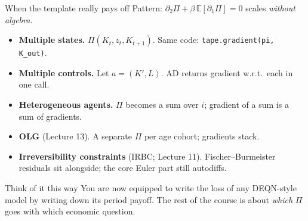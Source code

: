 \documentclass[aspectratio=169,11pt]{beamer}
\newcommand{\emphc}[1]{\textcolor{harvardcrimson}{#1}}
\begin{document}
\begin{frame}{When the template really pays off}
\small Pattern: $\partial_2 \Pi + \beta\,\mathbb{E}[\partial_1 \Pi] = 0$ scales \emph{without algebra}.
\vspace{2pt}
\begin{itemize}\itemsep3pt
\item \textbf{Multiple states.} $\Pi(K_t, z_t, K_{t+1})$. Same code: \texttt{tape.gradient(pi, K\_out)}.
\item \textbf{Multiple controls.} Let $a = (K', L)$. AD returns gradient w.r.t.\ each in one call.
\item \textbf{Heterogeneous agents.} $\Pi$ becomes a sum over $i$; gradient of a sum is a sum of gradients.
\item \textbf{OLG} (Lecture 13). A separate $\Pi$ per age cohort; gradients stack.
\item \textbf{Irreversibility constraints} (IRBC; Lecture 11). Fischer--Burmeister residuals sit alongside; the core Euler part still autodiffs.
\end{itemize}
\vspace{6pt}
\begin{exampleblock}{Think of it this way}
\small You are now equipped to write \emphc{the loss of any DEQN-style model} by writing down its period payoff. The rest of the course is about \emph{which} $\Pi$ goes with which economic question.
\end{exampleblock}
\end{frame}
\end{document}
